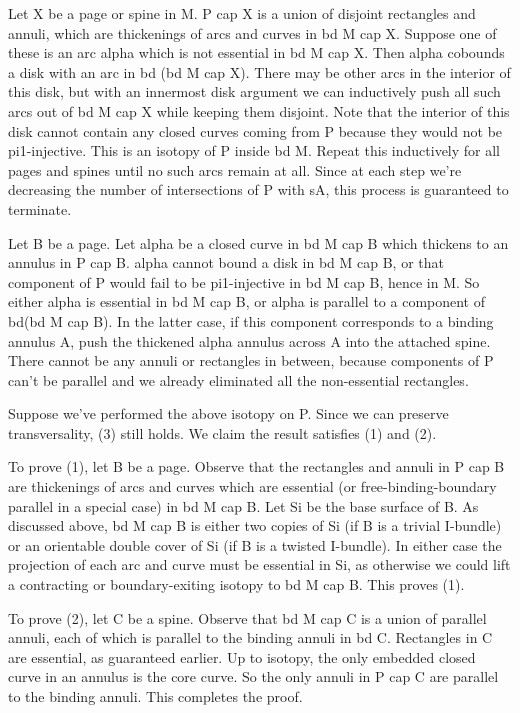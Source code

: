 Let X be a page or spine in M. P cap X is a union of disjoint rectangles and
annuli, which are thickenings of arcs and curves in bd M cap X. Suppose one of
these is an arc alpha which is not essential in bd M cap X. Then alpha cobounds
a disk with an arc in bd (bd M cap X). There may be other arcs in the interior
of this disk, but with an innermost disk argument we can inductively push all
such arcs out of bd M cap X while keeping them disjoint. Note that the interior
of this disk cannot contain any closed curves coming from P because they would
not be pi1-injective. This is an isotopy of P inside bd M.  Repeat this
inductively for all pages and spines until no such arcs remain at all.  Since
at each step we're decreasing the number of intersections of P with sA, this
process is guaranteed to terminate.

Let B be a page. Let alpha be a closed curve in bd M cap B which thickens to an
annulus in P cap B. alpha cannot bound a disk in bd M cap B, or that component
of P would fail to be pi1-injective in bd M cap B, hence in M. So either alpha
is essential in bd M cap B, or alpha is parallel to a component of bd(bd M cap
B). In the latter case, if this component corresponds to a binding annulus A,
push the thickened alpha annulus across A into the attached spine. There cannot
be any annuli or rectangles in between, because components of P can't be
parallel and we already eliminated all the non-essential rectangles.

Suppose we've performed the above isotopy on P. Since we can preserve
transversality, (3) still holds. We claim the result satisfies (1) and (2).

To prove (1), let B be a page. Observe that the rectangles and annuli in P cap
B are thickenings of arcs and curves which are essential (or
free-binding-boundary parallel in a special case) in bd M cap B. Let Si be the
base surface of B. As discussed above, bd M cap B is either two copies of Si
(if B is a trivial I-bundle) or an orientable double cover of Si (if B is
a twisted I-bundle). In either case the projection of each arc and curve must
be essential in Si, as otherwise we could lift a contracting or
boundary-exiting isotopy to bd M cap B. This proves (1).

To prove (2), let C be a spine. Observe that bd M cap C is a union of parallel
annuli, each of which is parallel to the binding annuli in bd C. Rectangles in
C are essential, as guaranteed earlier. Up to isotopy, the only embedded closed
curve in an annulus is the core curve. So the only annuli in P cap C are
parallel to the binding annuli. This completes the proof.

